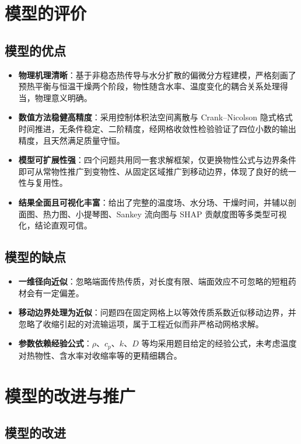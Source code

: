 \section{模型的评价}

\subsection{模型的优点}

\begin{itemize}
	\item \textbf{物理机理清晰}：基于非稳态热传导与水分扩散的偏微分方程建模，严格刻画了预热平衡与恒温干燥两个阶段，物性随含水率、温度变化的耦合关系处理得当，物理意义明确。
	\item \textbf{数值方法稳健高精度}：采用控制体积法空间离散与 Crank--Nicolson 隐式格式时间推进，无条件稳定、二阶精度，经网格收敛性检验验证了四位小数的输出精度，且天然满足质量守恒。
	\item \textbf{模型可扩展性强}：四个问题共用同一套求解框架，仅更换物性公式与边界条件即可从常物性推广到变物性、从固定区域推广到移动边界，体现了良好的统一性与复用性。
	\item \textbf{结果全面且可视化丰富}：给出了完整的温度场、水分场、干燥时间，并辅以剖面图、热力图、小提琴图、Sankey 流向图与 SHAP 贡献度图等多类型可视化，结论直观可信。
\end{itemize}

\subsection{模型的缺点}

\begin{itemize}
	\item \textbf{一维径向近似}：忽略端面传热传质，对长度有限、端面效应不可忽略的短粗药材会有一定偏差。
	\item \textbf{移动边界处理为近似}：问题四在固定网格上以等效传质系数近似移动边界，并忽略了收缩引起的对流输运项，属于工程近似而非严格动网格求解。
	\item \textbf{参数依赖经验公式}：$\rho$、$c_p$、$k$、$D$ 等均采用题目给定的经验公式，未考虑温度对热物性、含水率对收缩率等的更精细耦合。
\end{itemize}

\section{模型的改进与推广}

\subsection{模型的改进}


